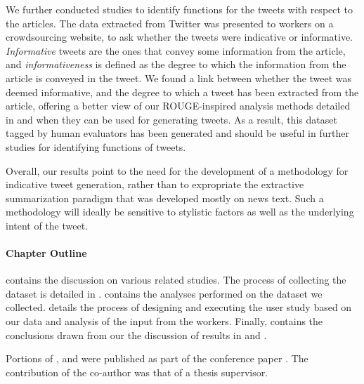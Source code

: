 We further conducted studies to identify functions for the tweets with respect to the articles. The data extracted from Twitter was presented to workers on a crowdsourcing website, to ask whether the tweets were indicative or informative. \textit{Informative} tweets are the ones that convey some information from the article, and \textit{informativeness} is defined as the degree to which the information from the article is conveyed in the tweet. We found a link between whether the tweet was deemed informative, and the degree to which a tweet has been extracted from the article, offering a better view of our ROUGE-inspired analysis methods detailed in  and when they can be used for generating tweets. As a result, this dataset tagged by human evaluators has been generated and should be useful in further studies for identifying functions of tweets. 

Overall, our results point to the need for the development of a methodology for indicative tweet generation, rather than to expropriate the extractive summarization paradigm that was developed mostly on news text. Such a methodology will ideally be sensitive to stylistic factors as well as the underlying intent of the tweet.

\paragraph{Chapter Outline}  contains the discussion on various related studies. The process of collecting the dataset is detailed in .  contains the analyses performed on the dataset we collected.  details the process of designing and executing the user study based on our data and analysis of the input from the workers. Finally,  contains the conclusions drawn from our the discussion of results in  and .

Portions of ,  and  were published as part of the conference paper \cite{sidhayeindicative}. The contribution of the co-author was that of a thesis supervisor. 

